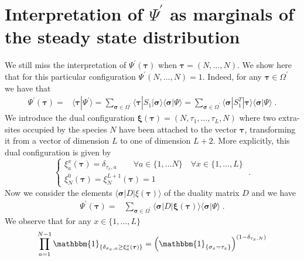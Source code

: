 \documentclass[10pt]{article}
\numberwithin{equation}{section}
\numberwithin{equation}{subsection}
\newcommand{\dt}{\;.}
\begin{document}
\section{Interpretation of $\Psi^{'}$ as marginals of the steady state distribution}\label{subsection-interpretationPSIp}
We still miss the interpretation of $\Psi^{'}(\bm{\tau})$ when  $\bm{\tau}= (N,\ldots,N)$. We show here that for this particular configuration
$\Psi^{'}(N,\ldots,N) =1$. Indeed, for any $\bm{\tau}\in \Omega^{'}$ we have that 
\begin{align}
	\Psi^{'}(\bm{\tau})=&\langle\bm{\tau}|\Psi^{'}\rangle=\sum_{\bm{\sigma}\in \Omega^{'}}\langle \bm{\tau}|S_{1}|\bm{\sigma}\rangle\langle \bm{\sigma}|\Psi\rangle=\sum_{\bm{\sigma}\in \Omega^{'}}\langle \bm{\sigma}|S_{1}^{T}|\bm{\tau}\rangle\langle \bm{\sigma}|\Psi\rangle\dt
\end{align} 
We introduce the dual configuration $\bm{\xi}(\bm{\tau})=(N,\tau_{1},\ldots,\tau_{L},N)$ where two extra-sites occupied by the species $N$ have been attached to the vector $\bm{\tau}$, transforming it from a vector of dimension $L$ to one of dimension $L+2$. More explicitly, this dual configuration is given by
\begin{equation}
	\begin{cases}
		\xi_{a}^{x}(\bm{\tau})= \delta_{\tau_{x},a}\qquad \forall a\in \{1,\ldots N\}\quad \forall x\in \{1,\ldots,L\}\\
		\xi_{N}^{0}(\bm{\tau})=\xi_{N}^{L+1}(\bm{\tau})=1
	\end{cases}\dt
\end{equation} Now we consider the elements $\langle\bm{\sigma}|D|\xi(\bm{\tau})\rangle$ of the duality matrix $D$ and we have
\begin{align}\label{useful-InInterpretation}
	\Psi^{'}(\bm{\tau})=&\sum_{\bm{\sigma}\in \Omega^{'}}\langle \bm{\sigma}|D|\bm{\xi}(\bm{\tau})\rangle\langle \bm{\sigma}|\Psi\rangle\dt
\end{align}
We observe that for any $x\in \{1,\ldots,L\}$
\begin{equation}
	\prod_{a=1}^{N-1}\mathbbm{1}_{\{\delta_{\sigma_{x},a}\geq\xi_{a}^{x}(\bm{\tau})\}}=\left(\mathbbm{1}_{\{\sigma_{x}=\tau_{x}\}}\right)^{(1-\delta_{\tau_{x},N})}%
\end{equation}
\end{document}
